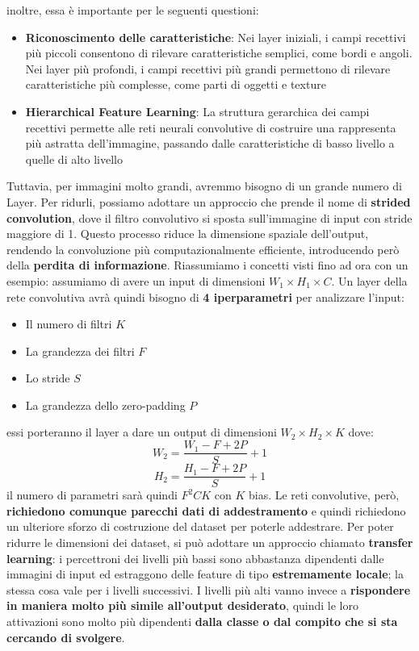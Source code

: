 \documentclass[12pt]{article}
\begin{document}
inoltre, essa è importante per le seguenti questioni:
\begin{itemize}
    \item \textbf{Riconoscimento delle caratteristiche}: Nei layer iniziali, i campi recettivi più piccoli consentono di rilevare caratteristiche semplici, come bordi e angoli. Nei layer più profondi, i campi recettivi più grandi permettono di rilevare caratteristiche più complesse, come parti di oggetti e texture
    \item \textbf{Hierarchical Feature Learning}: La struttura gerarchica dei campi recettivi permette alle reti neurali convolutive di costruire una rappresenta più astratta dell'immagine, passando dalle caratteristiche di basso livello a quelle di alto livello
\end{itemize}
Tuttavia, per immagini molto grandi, avremmo bisogno di un grande numero di Layer. Per ridurli, possiamo adottare un approccio che prende il nome di \textbf{strided convolution}, dove il filtro convolutivo si sposta sull'immagine di input con stride maggiore di 1. Questo processo riduce la dimensione spaziale dell'output, rendendo la convoluzione più computazionalmente
efficiente, introducendo però della \textbf{perdita di informazione}.
Riassumiamo i concetti visti fino ad ora con un esempio: assumiamo di avere un input di dimensioni $W_1 \times H_1 \times C$.
Un layer della rete convolutiva avrà quindi bisogno di \textbf{4 iperparametri} per analizzare l'input:
\begin{itemize}
    \item Il numero di filtri $K$
    \item La grandezza dei filtri $F$
    \item Lo stride $S$
    \item La grandezza dello zero-padding $P$
\end{itemize}
essi porteranno il layer a dare un output di dimensioni $W_2 \times H_2 \times K$ dove:
$$W_2 = \frac{W_1 - F + 2P}{S} + 1$$
$$H_2 = \frac{H_1 - F + 2P}{S} + 1$$
il numero di parametri sarà quindi $F^2 CK$ con $K$ bias.
Le reti convolutive, però, \textbf{richiedono comunque parecchi dati di addestramento} e quindi richiedono un ulteriore sforzo di costruzione del dataset per poterle addestrare.
Per poter ridurre le dimensioni dei dataset, si può adottare un approccio chiamato \textbf{transfer learning}: i percettroni dei livelli più bassi sono abbastanza dipendenti dalle immagini di input ed estraggono delle feature
di tipo \textbf{estremamente locale}; la stessa cosa vale per i livelli successivi. I livelli più alti vanno invece a \textbf{rispondere in maniera molto più simile all'output desiderato}, quindi le loro attivazioni sono molto più dipendenti \textbf{dalla classe o dal compito che si sta cercando di svolgere}.
\end{document}
